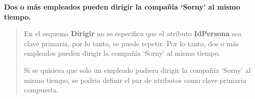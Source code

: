 \textbf{Dos o más empleados pueden dirigir la compañía ‘Sorny’ al mismo tiempo.}\vspace{.3cm}

\begin{quote}
    En el esquema \textbf{Dirigir} no se especifica que el atributo \textbf{IdPersona} sea clave primaria, por lo tanto, se puede repetir. Por lo tanto, dos o más empleados pueden dirigir la compañía ‘Sorny’ al mismo tiempo. \vspace{.2cm}

    Si se quisiera que solo un empleado pudiera dirigir la compañía ‘Sorny’ al mismo tiempo, se podria definir el par de atributos como clave primaria compuesta.
\end{quote}
\vspace{.3cm}